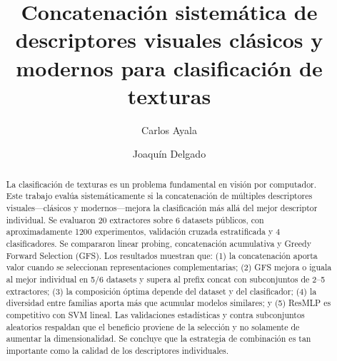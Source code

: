 \documentclass[a4paper,fleqn]{cas-sc}
\begin{document}
\let\WriteBookmarks\relax
\def\floatpagepagefraction{1}
\def\textpagefraction{.001}


\title[mode=title]{Concatenaci\'on sistem\'atica de descriptores visuales cl\'asicos y modernos para clasificaci\'on de texturas}

\tnotemark[1]

\author[1]{Carlos Ayala}
\cormark[1]
\fnmark[1]


\author[2]{Joaqu\'in Delgado}
\fnmark[1]



\begin{abstract}
La clasificaci\'on de texturas es un problema fundamental en visi\'on por computador. Este trabajo eval\'ua sistem\'aticamente si la concatenaci\'on de m\'ultiples descriptores visuales---cl\'asicos y modernos---mejora la clasificaci\'on m\'as all\'a del mejor descriptor individual. Se evaluaron 20 extractores sobre 6 datasets p\'ublicos, con aproximadamente 1200 experimentos, validaci\'on cruzada estratificada y 4 clasificadores. Se compararon linear probing, concatenaci\'on acumulativa y Greedy Forward Selection (GFS). Los resultados muestran que: (1) la concatenaci\'on aporta valor cuando se seleccionan representaciones complementarias; (2) GFS mejora o iguala al mejor individual en 5/6 datasets y supera al prefix concat con subconjuntos de 2--5 extractores; (3) la composici\'on \'optima depende del dataset y del clasificador; (4) la diversidad entre familias aporta m\'as que acumular modelos similares; y (5) ResMLP es competitivo con SVM lineal. Las validaciones estad\'isticas y contra subconjuntos aleatorios respaldan que el beneficio proviene de la selecci\'on y no solamente de aumentar la dimensionalidad. Se concluye que la estrategia de combinaci\'on es tan importante como la calidad de los descriptores individuales.
\end{abstract}
\end{document}
